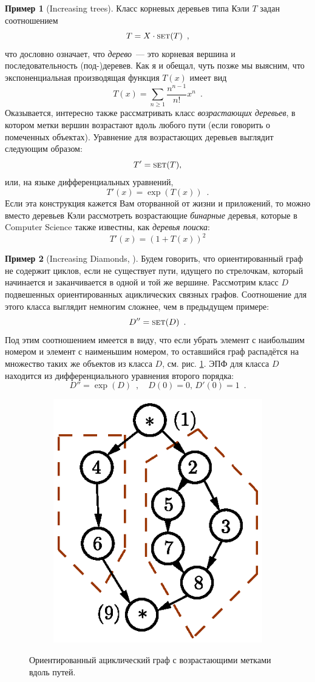 \documentclass[a5paper]{article}
\theoremstyle{definition}
\newtheorem{example}{Пример}
\begin{document}
\begin{example}[Increasing trees]
    Класс корневых деревьев типа Кэли \( T \) задан соотношением
\[
    T = X \cdot \text{\textsc{set}}(T) \enspace ,
\] 
что дословно означает, что \textit{дерево}~--- это корневая вершина и
последовательность (под-)деревев. Как я и обещал, чуть позже мы выясним, что
экспоненциальная производящая функция \( T(x) \) имеет вид
\[
    T(x) = \sum_{n \geq 1} \dfrac{n^{n-1}}{n!} x^n \enspace .
\]
Оказывается, интересно также рассматривать класс \textit{возрастающих деревьев},
в котором метки вершин возрастают вдоль любого пути (если говорить о помеченных
объектах). Уравнение для возрастающих деревьев выглядит следующим образом:
\[
    T' = \text{\textsc{set}}(T) ,
\]
или, на языке дифференциальных уравнений,
\[
    T'(x) = \exp(T(x)) \enspace .
\]
Если эта конструкция кажется Вам оторванной от жизни и приложений, то можно
вместо деревьев Кэли рассмотреть возрастающие \textit{бинарные} деревья, которые
в Computer Science также известны, как \textit{деревья поиска}:
\[
    T'(x) = (1 + T(x))^2
\]
\end{example}

\begin{example}[Increasing Diamonds, \cite{latin}]
    Будем говорить, что ориентированный граф не содержит циклов, если не
существует пути, идущего по стрелочкам, который начинается и заканчивается в
одной и той же вершине. 
    Рассмотрим класс \( D \) подвешенных ориентированных ациклических связных
графов. Соотношение для этого класса выглядит немногим сложнее, чем в предыдущем
примере:
\[
    D'' = \text{\textsc{set}}(D) \enspace .
\]
Под этим соотношением имеется в виду, что если убрать элемент с наибольшим
номером и элемент с наименьшим номером, то оставшийся граф распадётся на
множество таких же объектов из класса \( D \), см. рис. \ref{fig:dag}. ЭПФ для
класса \( D \) находится из дифференциального уравнения второго порядка:
\[
    D'' = \exp(D) \enspace ,  \quad D(0) = 0, \, D'(0) = 1
\enspace .                                  
\] 
\end{example}
\begin{figure}[h]
\centering
\begin{subfigure}{.8\textwidth}
    \centering
    \includegraphics[width=.4\textwidth]{dag}
\end{subfigure}%
\caption{Ориентированный ациклический граф с возрастающими метками вдоль
путей.}
\label{fig:dag}	
\end{figure}
\end{document}
